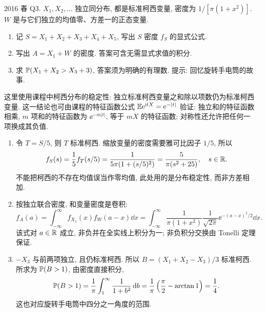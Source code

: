 \begin{exercise}\label{ex:fe2016q3}
2016 春 Q3. $X_1,X_2,\ldots$ 独立同分布, 都是标准柯西变量, 密度为 $1/[\pi(1+x^2)]$. $W$ 是与它们独立的均值零、方差一的正态变量.
\begin{enumerate}[label=(\alph*)]
\item\label{ex:fe2016q3-a} 记 $S=X_1+X_2+X_3+X_4+X_5$, 写出 $S$ 密度 $f_S$ 的显式公式.
\item\label{ex:fe2016q3-b} 写出 $A=X_1+W$ 的密度. 答案可含无需显式求值的积分.
\item\label{ex:fe2016q3-c} 求 $\mathbb P(X_1+X_2>X_3+3)$, 答案须为明确的有理数. 提示: 回忆旋转手电筒的故事.
\end{enumerate}
\end{exercise}
\begin{solution}
这里使用课程中柯西分布的稳定性: 独立标准柯西变量之和除以项数仍为标准柯西变量. 这一结论也可由课程的特征函数公式 $\mathbb E\mathrm e^{\mathrm i tX}=\mathrm e^{-|t|}$ 验证: 独立和的特征函数相乘, $m$ 项和的特征函数为 $\ee^{-m|t|}$, 等于 $mX$ 的特征函数; 对称性还允许把任何一项换成其负值.
\begin{enumerate}[label=(\alph*)]
\item\label{sol:fe2016q3-a} 令 $T=S/5$, 则 $T$ 标准柯西. 缩放变量的密度需要雅可比因子 $1/5$, 所以
\[
 f_S(s)=\frac15f_T(s/5)=\frac1{5\pi(1+(s/5)^2)}=\frac5{\pi(s^2+25)},\quad s\in\mathbb R.
\]
不能把柯西的不存在均值误当作零均值, 此处用的是分布稳定性, 而非方差相加.
\item\label{sol:fe2016q3-b} 按独立联合密度, 和变量密度是卷积:
\[
 f_A(a)=\int_{-\infty}^{\infty}f_{X_1}(x)f_W(a-x)\dd x
 =\int_{-\infty}^{\infty}\frac1{\pi(1+x^2)}
 \frac1{\sqrt{2\pi}}\ee^{-(a-x)^2/2}\dd x.
\]
该式对 $a\in\mathbb R$ 成立, 非负并在全实线上积分为一; 非负积分交换由 Tonelli 定理保证.
\item\label{sol:fe2016q3-c} $-X_3$ 与前两项独立, 且仍标准柯西. 所以 $B=(X_1+X_2-X_3)/3$ 标准柯西. 所求为 $\mathbb P(B>1)$, 由密度直接积分,
\[
 \mathbb P(B>1)=\frac1\pi\int_1^\infty\frac1{1+b^2}\,\mathrm d b
 =\frac1\pi\left(\frac\pi2-\arctan1\right)=\frac14.
\]
这也对应旋转手电筒中四分之一角度的范围.
\end{enumerate}
\end{solution}

